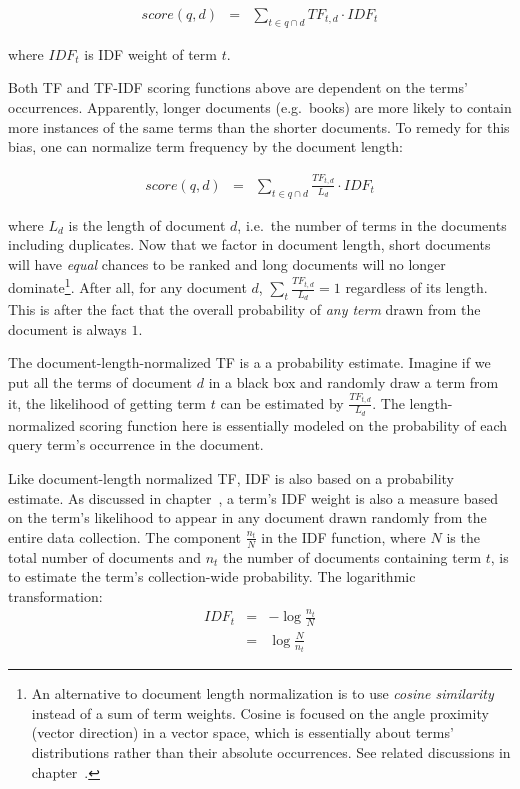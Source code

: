 \documentclass[
  letterpaper,
]{scrbook}
\begin{document}
\[\begin{aligned}
score(q,d)
& = & \sum_{t \in q \cap d} TF_{t,d} \cdot IDF_{t}
\end{aligned}\]

where \(IDF_t\) is IDF weight of term \(t\).

Both TF and TF-IDF scoring functions above are dependent on the terms'
occurrences. Apparently, longer documents (e.g.~books) are more likely
to contain more instances of the same terms than the shorter documents.
To remedy for this bias, one can normalize term frequency by the
document length:

\[\begin{aligned}
score(q,d)
& = & \sum_{t \in q \cap d} \frac{TF_{t,d}}{L_d} \cdot IDF_{t}
\end{aligned}\]

where \(L_d\) is the length of document \(d\), i.e.~the number of terms
in the documents including duplicates. Now that we factor in document
length, short documents will have \emph{equal} chances to be ranked and
long documents will no longer dominate\footnote{An alternative to
  document length normalization is to use \emph{cosine similarity}
  instead of a sum of term weights. Cosine is focused on the angle
  proximity (vector direction) in a vector space, which is essentially
  about terms' distributions rather than their absolute occurrences. See
  related discussions in chapter~.}. After all, for any document \(d\),
\(\sum_t \frac{TF_{t,d}}{L_d} = 1\) regardless of its length. This is
after the fact that the overall probability of \emph{any term} drawn
from the document is always \(1\).

The document-length-normalized TF is a a probability estimate. Imagine
if we put all the terms of document \(d\) in a black box and randomly
draw a term from it, the likelihood of getting term \(t\) can be
estimated by \(\frac{TF_{t,d}}{L_d}\). The length-normalized scoring
function here is essentially modeled on the probability of each query
term's occurrence in the document.

Like document-length normalized TF, IDF is also based on a probability
estimate. As discussed in chapter~, a term's IDF weight is also a
measure based on the term's likelihood to appear in any document drawn
randomly from the entire data collection. The component
\(\frac{n_t}{N}\) in the IDF function, where \(N\) is the total number
of documents and \(n_t\) the number of documents containing term \(t\),
is to estimate the term's collection-wide probability. The logarithmic
transformation: \[\begin{aligned}
IDF_t
& = & -\log{\frac{n_t}{N}} \\
& = & \log{\frac{N}{n_t}}
\end{aligned}\]
\end{document}

